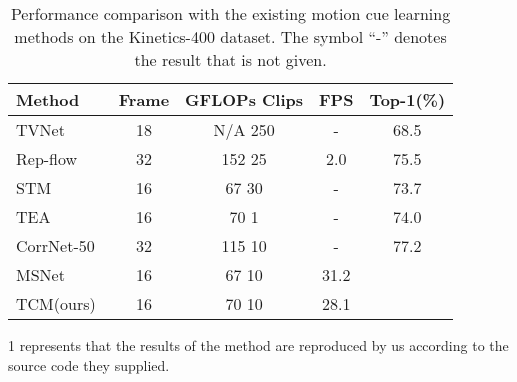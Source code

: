 \documentclass[journal]{IEEEtran}
\begin{document}
\begin{table}[!ht]
\centering
\caption{Performance comparison with the existing motion cue learning methods on the Kinetics-400 dataset. The symbol ``-” denotes the result that is not given.}
\label{tab:motion-k400}
\begin{threeparttable}
\begin{tabular}{lcccc}
\hline
Method                   & Frame & GFLOPs  Clips & FPS & Top-1(\%) \\ \hline
TVNet~\cite{fan2018end} & 18    & N/A  250     & -    & 68.5 \\
Rep-flow~\cite{piergiovanni2019representation} & 32    & 152 25     & 2.0    & 75.5 \\
STM~\cite{jiang2019stm} & 16    & 67 30      & -    & 73.7 \\
TEA~\cite{li2020tea}    & 16    & 70 1       & -    & 74.0 \\
CorrNet-50~\cite{wang2020video} & 32  & 115  10      & -    & 77.2 \\
MSNet~\cite{kwon2020motionsqueeze}  & 16    & 67  10     & 31.2  &  \\
TCM(ours)                     & 16    & 70 10     & 28.1  &  \\
\hline
\end{tabular}
\begin{tablenotes}
  \footnotesize
  \item[1] represents that the results of the method are reproduced by us according to the source code they supplied.
\end{tablenotes}
\end{threeparttable}
\end{table}
\end{document}
